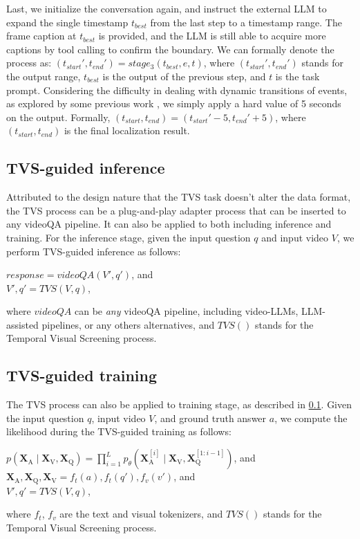 Last, we initialize the conversation again, and instruct the external LLM to expand the single timestamp $t_{best}$ from the last step to a timestamp range. The frame caption at $t_{best}$ is provided, and the LLM is still able to acquire more captions by tool calling to confirm the boundary. We can formally denote the process as: $(t_{start}', t_{end}') = stage_3(t_{best}, e, t)$, where $(t_{start}', t_{end}')$ stands for the output range, $t_{best}$ is the output of the previous step, and $t$ is the task prompt. Considering the difficulty in dealing with dynamic transitions of events, as explored by some previous work \citep{zheng2024trainingfreevideotemporalgrounding}, we simply apply a hard value of 5 seconds on the output. Formally, $(t_{start}, t_{end}) = (t_{start}'-5, t_{end}'+5)$, where $(t_{start}, t_{end})$ is the final localization result. 

\subsection{TVS-guided inference}
\label{subsection:tvs-guided-inference}

Attributed to the design nature that the TVS task doesn't alter the data format, the TVS process can be a plug-and-play adapter process that can be inserted to any videoQA pipeline. It can also be applied to both including inference and training. For the inference stage, given the input question $q$ and input video $V$, we perform TVS-guided inference as follows:

$ response = videoQA(V', q') $,
and \\
$ V', q' = TVS(V, q) $,

where $videoQA$ can be \emph{any} videoQA pipeline, including video-LLMs, LLM-assisted pipelines, or any others alternatives, and $TVS()$ stands for the Temporal Visual Screening process. 


\subsection{TVS-guided training}
\label{subsection:tvs-guided-training}
The TVS process can also be applied to training stage, as described in \ref{subsection:tvs-guided-inference}. Given the input question $q$, input video $V$, and ground truth answer $a$, we compute the likelihood during the TVS-guided training as follows:

$p\left( \mathbf{X}_\mathrm{A} \mid \mathbf{X}_\mathrm{V}, \mathbf{X}_\mathrm{Q} \right)
= \prod_{i=1}^{L} p_{\theta} \left( \mathbf{X}_\mathrm{A}^{[i]} \mid \mathbf{X}_\mathrm{V}, \mathbf{X}_\mathrm{Q}^{[1:i-1]} \right)$, and \\
$ \mathbf{X}_\mathrm{A}, \mathbf{X}_\mathrm{Q}, \mathbf{X}_\mathrm{V} = f_t(a), f_t(q'), f_v(v')$, and \\
$ V', q' = TVS(V, q) $,

where $f_t$, $f_v$ are the text and visual tokenizers, and $TVS()$ stands for the Temporal Visual Screening process.




  

  
